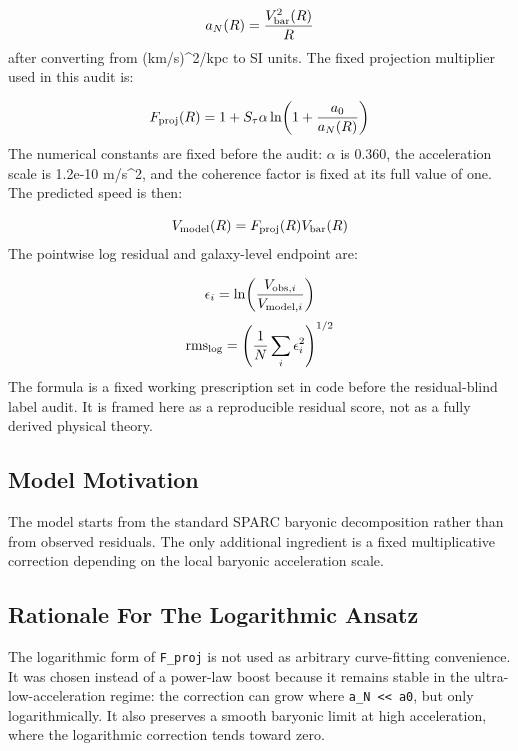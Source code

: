\documentclass[11pt]{article}
\begin{document}
\begin{equation}
a_N(R)=\frac{V_{\rm bar}^2(R)}{R}
\end{equation}
after converting from (km/s)\textasciicircum{}2/kpc to SI units. The fixed projection multiplier used in this audit is:

\begin{equation}
F_{\rm proj}(R)=1+S_\tau\alpha\ln\!\left(1+\frac{a_0}{a_N(R)}\right)
\end{equation}
The numerical constants are fixed before the audit: $\alpha$ is 0.360, the acceleration scale is 1.2e-10 m/s\textasciicircum{}2, and the coherence factor is fixed at its full value of one. The predicted speed is then:

\begin{equation}
V_{\rm model}(R)=F_{\rm proj}(R)V_{\rm bar}(R)
\end{equation}
The pointwise log residual and galaxy-level endpoint are:

\begin{equation}
\epsilon_i=\ln\!\left(\frac{V_{{\rm obs},i}}{V_{{\rm model},i}}\right)
\end{equation}
\begin{equation}
{\rm rms}_{\log}=\left(\frac{1}{N}\sum_i\epsilon_i^2\right)^{1/2}
\end{equation}
The formula is a fixed working prescription set in code before the residual-blind label audit. It is framed here as a reproducible residual score, not as a fully derived physical theory.

\subsection{Model Motivation}
The model starts from the standard SPARC baryonic decomposition rather than from observed residuals. The only additional ingredient is a fixed multiplicative correction depending on the local baryonic acceleration scale.

\subsection{Rationale For The Logarithmic Ansatz}
The logarithmic form of \texttt{F\_proj} is not used as arbitrary curve-fitting convenience. It was chosen instead of a power-law boost because it remains stable in the ultra-low-acceleration regime: the correction can grow where \texttt{a\_N << a0}, but only logarithmically. It also preserves a smooth baryonic limit at high acceleration, where the logarithmic correction tends toward zero.
\end{document}
